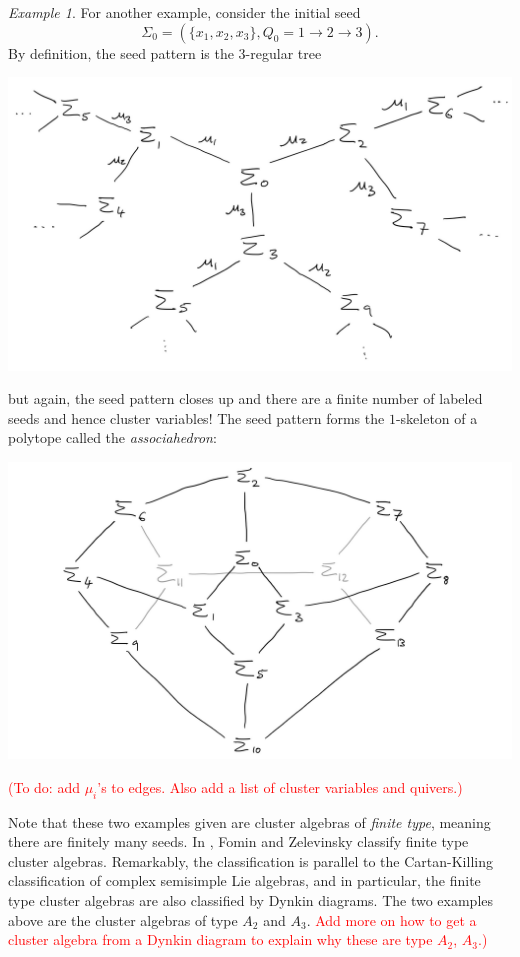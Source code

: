 \documentclass[12pt]{amsart}
\theoremstyle{remark}
\theoremstyle{remark}
\newtheorem*{example}{Example}
\begin{document}
\begin{example}
For another example, consider the initial seed
$$\Sigma_0 = (\{x_1, x_2, x_3\}, Q_0 = 1 \to 2 \to 3).$$
By definition, the seed pattern is the $3$-regular tree

\centerline{\includegraphics[width=\textwidth]{seed_pattern_2}}

\noindent
but again, the seed pattern closes up and there are a finite number of labeled seeds and hence cluster variables!
The seed pattern forms the $1$-skeleton of a polytope called the \emph{associahedron}:

\centerline{\includegraphics[width=\textwidth]{associahedron}}

\noindent
\textcolor{red}{(To do: add $\mu_i$'s to edges. Also add a list of cluster variables and quivers.)}
\end{example}

Note that these two examples given are cluster algebras of \emph{finite type}, meaning there are finitely many seeds.
In \cite{FS03}, Fomin and Zelevinsky classify finite type cluster algebras.
Remarkably, the classification is parallel to the Cartan-Killing classification of complex semisimple Lie algebras, and in particular, the finite type cluster algebras are also classified by Dynkin diagrams.
The two examples above are the cluster algebras of type $A_2$ and $A_3$.
\textcolor{red}{Add more on how to get a cluster algebra from a Dynkin diagram to explain why these are type $A_2$, $A_3$.)}
 
\end{document}

